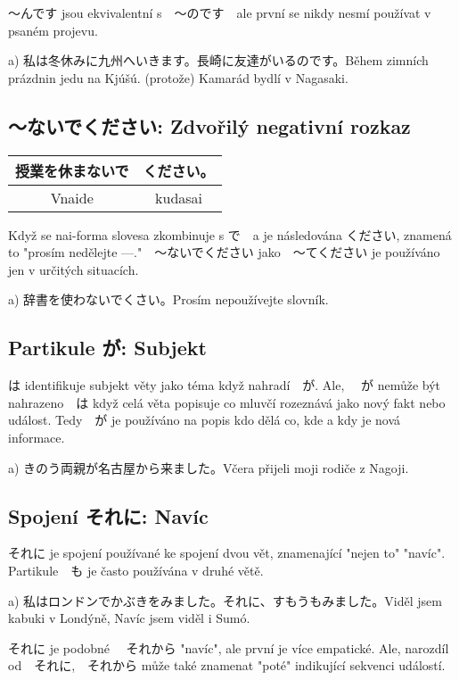 〜んです jsou ekvivalentní s　〜のです　ale první se nikdy nesmí používat v psaném projevu.

a) 私は冬休みに九州へいきます。長崎に友達がいるのです。Během zimních prázdnin jedu na Kjúšú. (protože) Kamarád bydlí v Nagasaki.



\subsection{〜ないでください: Zdvořilý negativní rozkaz}
\begin{center}
\begin{tabular}{|c|c|}
\hline
授業を休まないで &ください。\\
\hline
Vnaide&kudasai\\
\hline
\end{tabular}
\end{center}

Když se nai-forma slovesa zkombinuje s で　a je následována ください, znamená to "prosím nedělejte ---."　〜ないでください jako　〜てください je používáno jen v určitých situacích.

a) 辞書を使わないでくさい。Prosím nepoužívejte slovník.

\subsection{Partikule が: Subjekt}
は identifikuje subjekt věty jako téma když nahradí　が. Ale, 　が nemůže být nahrazeno　は když celá věta popisuje co mluvčí rozeznává jako nový fakt nebo událost. Tedy　が je používáno na popis kdo dělá co, kde a kdy je nová informace.　

a) きのう両親が名古屋から来ました。Včera přijeli moji rodiče z Nagoji.


\subsection{Spojení それに: Navíc} 
それに je spojení používané ke spojení dvou vět, znamenající "nejen to" "navíc". Partikule　も je často používána v druhé větě.

a) 私はロンドンでかぶきをみました。それに、すもうもみました。Viděl jsem kabuki v Londýně, Navíc jsem viděl i Sumó.

それに je podobné 　それから "navíc", ale první je více empatické. Ale, narozdíl od　それに,　それから může také znamenat "poté" indikující sekvenci událostí.
























